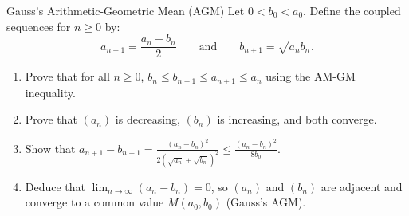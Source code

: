 \begin{exercise}{Gauss's Arithmetic-Geometric Mean (AGM)}
Let $0 < b_0 < a_0$. Define the coupled sequences for $n \ge 0$ by:
\[
a_{n+1} = \frac{a_n + b_n}{2} \qquad \text{and} \qquad b_{n+1} = \sqrt{a_n b_n}.
\]
\begin{enumerate}[leftmargin=1.5em,itemsep=2pt]
  \item Prove that for all $n \ge 0$, $b_n \le b_{n+1} \le a_{n+1} \le a_n$ using the AM-GM inequality.
  \item Prove that $(a_n)$ is decreasing, $(b_n)$ is increasing, and both converge.
  \item Show that $a_{n+1} - b_{n+1} = \frac{(a_n - b_n)^2}{2(\sqrt{a_n} + \sqrt{b_n})^2} \le \frac{(a_n - b_n)^2}{8b_0}$.
  \item Deduce that $\lim_{n \to \infty} (a_n - b_n) = 0$, so $(a_n)$ and $(b_n)$ are adjacent and converge to a common value $M(a_0, b_0)$ (Gauss's AGM).
\end{enumerate}
\end{exercise}

\begin{tabletworkspace}[5.5cm]
\end{tabletworkspace}

